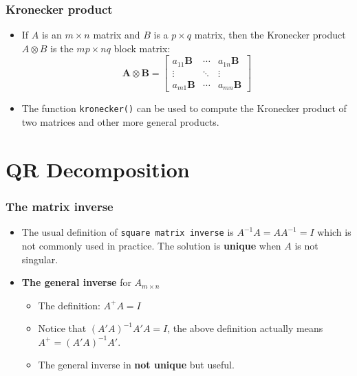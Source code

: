 \documentclass[10pt]{beamer}
\begin{document}
\begin{frame}
  \frametitle{Kronecker product}

  \begin{itemize}
  \item If $A$ is an $m\times n$ matrix and $B$ is a $p \times q$
    matrix, then the Kronecker product $A \otimes  B$ is the $mp \times nq$ block matrix:
    \begin{equation*}
          \mathbf{A}\otimes\mathbf{B} = \begin{bmatrix} a_{11} \mathbf{B} & \cdots & a_{1n}\mathbf{B} \\ \vdots & \ddots & \vdots \\ a_{m1} \mathbf{B} & \cdots & a_{mn} \mathbf{B} \end{bmatrix}
    \end{equation*}

  \item The function \texttt{kronecker()} can be used to compute the Kronecker product
of two matrices and other more general products.

  \end{itemize}

\end{frame}

\section{QR Decomposition}

\begin{frame}
  \frametitle{The matrix inverse}

  \begin{itemize}
  \item The usual definition of \texttt{square matrix inverse} is $A^{-1}A =
    AA^{-1}=I$ which is not commonly used in practice. The solution is
    \textbf{unique} when $A$ is not singular.

  \item \textbf{The general inverse} for $A_{m\times n}$

    \begin{itemize}
    \item The definition: $A^{+} A = I$

    \item Notice that $(A'A)^{-1}A'A=I$, the above definition actually
      means $A^{+}=(A'A)^{-1}A'$.

    \item The general inverse in \textbf{not unique} but useful.

    \end{itemize}

  \end{itemize}

\end{frame}
\end{document}
